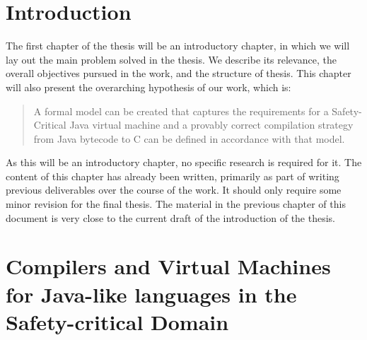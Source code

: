 \documentclass[a4paper,10pt]{report}
\begin{document}
\section{Introduction}

The first chapter of the thesis will be an introductory chapter, in
which we will lay out the main problem solved in the thesis.
We describe its relevance, the overall objectives pursued in the work,
and the structure of thesis.
This chapter will also present the overarching hypothesis of our work,
which is:
\begin{quote}
  A formal model can be created that captures the requirements for a
  Safety-Critical Java virtual machine and a provably correct
  compilation strategy from Java bytecode to C can be defined in
  accordance with that model.
\end{quote}
As this will be an introductory chapter, no specific research is
required for it.
The content of this chapter has already been written, primarily as
part of writing previous deliverables over the course of the work.
It should only require some minor revision for the final thesis.
The material in the previous chapter of this document is very close to
the current draft of the introduction of the thesis.

\section{Compilers and Virtual Machines for Java-like languages in the
  Safety-critical Domain}
\end{document}
